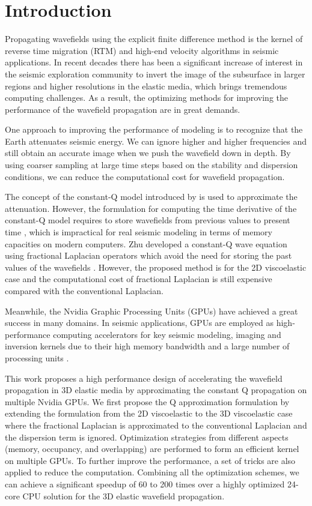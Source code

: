 \documentclass{paris17}
\begin{document}
\section{Introduction}

Propagating wavefields using the explicit finite difference method is the kernel of reverse time migration (RTM) and high-end velocity algorithms in seismic applications. In recent decades there has been a significant increase of interest in the seismic exploration community to invert the image of the subsurface in larger regions and higher resolutions in the elastic media, which brings tremendous computing challenges. As a result, the optimizing methods for improving the performance of the wavefield propagation are in great demands.

One approach to improving the performance of modeling is to recognize that the Earth attenuates seismic energy. We can ignore higher and higher frequencies and still obtain an accurate image\cite[]{Clapp.sep.111.bob3} when we push the wavefield down in depth. By using coarser sampling at large time steps based on the stability and dispersion conditions, we can reduce the computational cost for wavefield propagation. 

The concept of the constant-Q model introduced by \cite{Kjartansson.sep.23} is used to approximate the attenuation. However, the formulation for computing the time derivative of the constant-Q model requires to store wavefields from previous values to present time \cite[]{podlubny1998fractional}, which is impractical for real seismic modeling in terms of memory capacities on modern computers. Zhu developed a constant-Q wave equation using fractional Laplacian operators which avoid the need for storing the past values of the wavefields \cite[]{zhu2014theory}. However, the proposed method is for the 2D viscoelastic case and the computational cost of fractional Laplacian is still expensive compared with the conventional Laplacian.

Meanwhile, the Nvidia Graphic Processing Units (GPUs)  have achieved a great success in many domains. In seismic applications, GPUs are employed as high-performance computing accelerators for key seismic modeling, imaging and inversion kernels due to their high memory bandwidth and a large number of processing units \cite[]{he2015gpu}.

This work proposes a high performance design of accelerating the wavefield propagation in 3D elastic media by approximating the constant Q propagation on multiple Nvidia GPUs. We first propose the Q approximation formulation by extending the formulation from the 2D viscoelastic to the 3D viscoelastic case where the fractional Laplacian is approximated to the conventional Laplacian and the dispersion term is ignored.  Optimization strategies from different aspects (memory, occupancy, and overlapping) are performed to form an efficient kernel on multiple GPUs. To further improve the performance, a set of tricks are also applied to reduce the computation. Combining all the optimization schemes, we can achieve a significant speedup of 60 to 200 times over a highly optimized 24-core CPU solution for the 3D elastic wavefield propagation.
\end{document}
